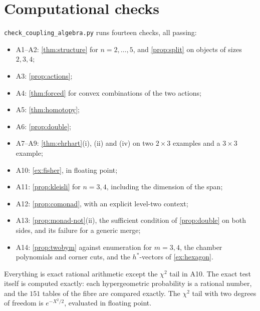 \documentclass[11pt]{article}
\theoremstyle{definition}
\theoremstyle{remark}
\begin{document}
\section{Computational checks}\label{sec:code}

\texttt{check\_coupling\_algebra.py} runs fourteen checks, all passing:
\begin{itemize}[leftmargin=*,nosep]
\item A1--A2: \cref{thm:structure} for $n=2,\dots,5$, and \cref{prop:split} on objects of sizes $2,3,4$;
\item A3: \cref{prop:actions};
\item A4: \cref{thm:forced} for convex combinations of the two actions;
\item A5: \cref{thm:homotopy};
\item A6: \cref{prop:double};
\item A7--A9: \cref{thm:ehrhart}(i), (ii) and (iv) on two $2\times3$ examples and a $3\times3$ example;
\item A10: \cref{ex:fisher}, in floating point;
\item A11: \cref{prop:kleisli} for $n=3,4$, including the dimension of the span;
\item A12: \cref{prop:comonad}, with an explicit level-two context;
\item A13: \cref{prop:monad-not}(ii), the sufficient condition of \cref{prop:double} on both sides, and its failure for a generic merge;
\item A14: \cref{prop:twobym} against enumeration for $m=3,4$, the chamber polynomials and corner cuts, and the $h^*$-vectors of
  \cref{ex:hexagon}.
\end{itemize}
Everything is exact rational arithmetic except the $\chi^2$ tail in A10. The exact test itself is computed exactly: each
hypergeometric probability is a rational number, and the $151$ tables of the fibre are compared exactly. The $\chi^2$ tail with
two degrees of freedom is $e^{-X^2/2}$, evaluated in floating point.
\end{document}
